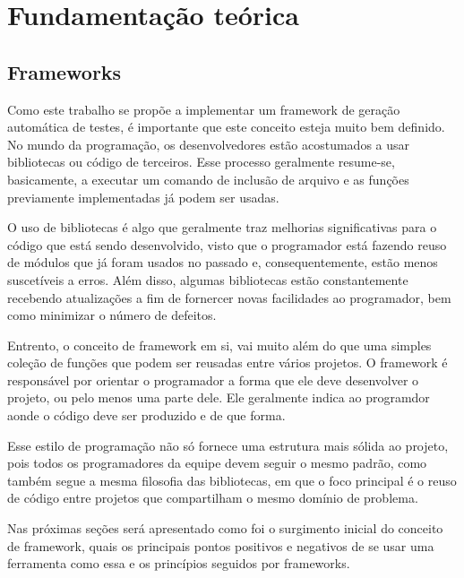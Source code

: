 \documentclass[
    12pt,       %
    openright,      %
    twoside,      %
    a4paper,      %
    english,      %
    french,       %
    spanish,      %
    brazil,       %
    ]{abntex2}
\begin{document}
  

  \part{Fundamentação teórica}

  \chapter{Frameworks}

      Como este trabalho se propõe a implementar um framework de geração
      automática de testes, é importante que este conceito esteja muito bem
      definido. No mundo da programação, os desenvolvedores estão
      acostumados a usar bibliotecas ou código de terceiros. Esse processo
      geralmente resume-se, basicamente, a executar um comando de inclusão
      de arquivo e as funções previamente implementadas já podem ser usadas.

      O uso de bibliotecas é algo que geralmente traz melhorias significativas
      para o código que está sendo desenvolvido, visto que o programador
      está fazendo reuso de módulos que já foram usados no passado e,
      consequentemente, estão menos suscetíveis a erros. Além
      disso, algumas bibliotecas estão constantemente recebendo atualizações
      a fim de fornercer novas facilidades ao programador, bem como minimizar
      o número de defeitos.

      Entrento, o conceito de framework em si, vai muito além do que uma
      simples coleção de funções que podem ser reusadas entre vários
      projetos. O framework é responsável por orientar o programador
      a forma que ele deve desenvolver o projeto, ou pelo menos uma parte dele.
      Ele geralmente indica ao programdor aonde o código deve ser
      produzido e de que forma.

      Esse estilo de programação não só fornece uma estrutura mais sólida
      ao projeto, pois todos os programadores da equipe devem seguir o mesmo
      padrão, como também segue a mesma filosofia das bibliotecas, em que o
      foco principal é o reuso de código entre projetos que compartilham
      o mesmo domínio de problema.

      Nas próximas seções será apresentado como foi o surgimento inicial
      do conceito de framework, quais os principais pontos positivos e
      negativos de se usar uma ferramenta como essa e os princípios
      seguidos por frameworks.
\end{document}

